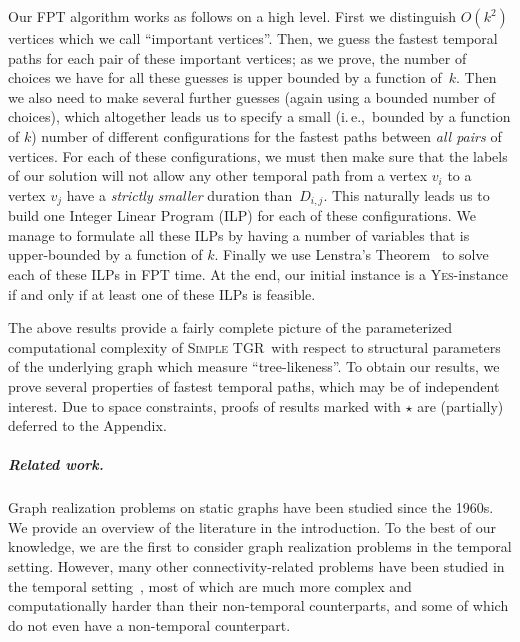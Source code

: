 \documentclass[a4paper,UKenglish,cleveref, autoref, thm-restate, anonymous]{lipics-v2021}
\newcommand{\ie}{i.\,e.,\ }
\newcommand{\deltaExact}{\textsc{Simple TGR}}
\begin{document}
Our FPT algorithm works as follows on a high level. 
First we distinguish $O(k^2)$ vertices which we call ``important vertices''. 
Then, we guess the fastest temporal paths for each pair of these important vertices; as we prove, the number of choices we have for all these guesses is upper bounded by a function of~$k$. 
Then we also need to make several further guesses (again using a bounded number of choices), which altogether leads us to specify a small (\ie bounded by a function of $k$) number of different configurations for the fastest paths between \emph{all pairs} of vertices. For each of these configurations, we must then make sure that the labels of our solution will not allow any other temporal path from a vertex $v_i$ to a vertex $v_j$ have a \emph{strictly smaller} duration than~$D_{i,j}$.
This naturally leads us to build one Integer Linear Program (ILP) for each of these configurations. We manage to formulate all these ILPs by having a number of variables that is upper-bounded by a function of $k$. Finally we use Lenstra's Theorem~\cite{Lenstra1983Integer} to solve each of these ILPs in FPT time. At the end, our initial instance is a \textsc{Yes}-instance if and only if at least one of these ILPs is feasible.




The above results provide a fairly complete picture of the parameterized computational complexity of \deltaExact\ with respect to structural parameters of the underlying graph which measure ``tree-likeness''. To obtain our results, we prove several properties of fastest temporal paths, which may be of independent interest. 
Due to space constraints, proofs of results marked with $\star$ are (partially) deferred to the Appendix.


\subparagraph{Related work.} Graph realization problems on static graphs have been studied since the 1960s. We provide an overview of the literature in the introduction. 
To the best of our knowledge, we are the first to consider graph realization problems in the temporal setting. However, many other connectivity-related problems have been studied in the temporal setting~\cite{Mertzios-transitivity21,Akrida-explorer-21,enright2021deleting,MolterRZ21,klobas2023interference,deligkas2022optimizing,erlebach2021temporal,Flu+19a,Zsc+19,CasteigtsCS22,FuchsleMNR22}, most of which are much more complex and computationally harder than their non-temporal counterparts, and some of which do not even have a non-temporal counterpart.

\end{document}
